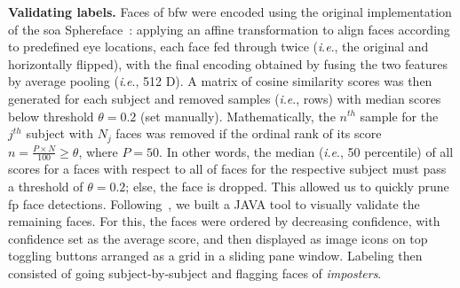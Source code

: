 \documentclass[10pt,twocolumn,letterpaper]{article}
\newcommand{\ie}{\textit{i}.\textit{e}., }
\begin{document}
\vspace{1mm}
\noindent\textbf{Validating labels.} 
Faces of \gls{bfw} were encoded using the original implementation of the \gls{soa} Sphereface~\cite{liu2017sphereface}: applying an affine transformation to align faces according to predefined eye locations, each face fed through twice (\ie the original and horizontally flipped), with the final encoding obtained by fusing the two features by average pooling (\ie 512 D). A matrix of cosine similarity scores was then generated for each subject and removed samples (\ie rows) with median scores below threshold $\theta=0.2$ (set manually). Mathematically, the $n^{th}$ sample for the $j^{th}$ subject with $N_j$ faces was removed if the ordinal rank of its score $n = \frac{P\times N}{100}\geq\theta$, where $P=50$. In other words, the median (\ie 50 percentile) of all scores for a faces with respect to all of faces for the respective subject must pass a threshold of $\theta=0.2$; else, the face is dropped. This allowed us to quickly prune \gls{fp} face detections. Following~\cite{robinson2016families, robinson2018visual}, we built a JAVA tool to visually validate the remaining faces. For this, the faces were ordered by decreasing confidence, with confidence set as the average score, and then displayed as image icons on top toggling buttons arranged as a grid in a sliding pane window. Labeling then consisted of going subject-by-subject and flagging faces of \emph{imposters}.
\end{document}
